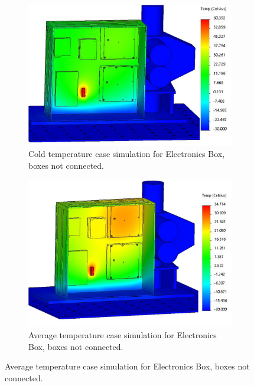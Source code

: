 \begin{figure}
    \centering
    \begin{subfigure}[h]{0.5\textwidth}
        \centering
        \includegraphics[width=\textwidth]{chap3_images/LIFE_V4_images/TA_Full_Model_Iter_10_ebox_FIXED.png}
        \caption{Cold temperature case simulation for Electronics Box, boxes not connected.}
        \label{fig:LIFE_V4_TA_Ebox_2a}
    \end{subfigure}
    \begin{subfigure}[h]{0.5\textwidth}
        \centering
        \includegraphics[width=\textwidth]{chap3_images/LIFE_V4_images/TA_Full_Model_Iter_11_ebox_FIXED.png}
        \caption{Average temperature case simulation for Electronics Box, boxes not connected.}
        \label{fig:LIFE_V4_TA_Ebox_2b}
    \end{subfigure}

\end{figure}

